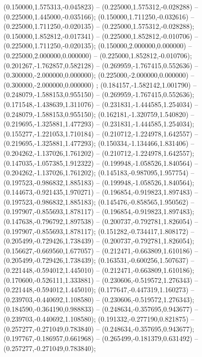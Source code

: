 (0.150000,1.575313,-0.045823) -- (0.225000,1.575312,-0.028288) -- (0.225000,1.445000,-0.035166);
 (0.150000,1.711250,-0.032616) -- (0.225000,1.711250,-0.020135) -- (0.225000,1.575312,-0.028288);
 (0.150000,1.852812,-0.017341) -- (0.225000,1.852812,-0.010706) -- (0.225000,1.711250,-0.020135);
 (0.150000,2.000000,0.000000) -- (0.225000,2.000000,0.000000) -- (0.225000,1.852812,-0.010706);
 (0.201267,-1.762857,0.582128) -- (0.269959,-1.767415,0.552636) -- (0.300000,-2.000000,0.000000);
 (0.225000,-2.000000,0.000000) -- (0.300000,-2.000000,0.000000) ;
 (0.184157,-1.582142,1.001790) -- (0.248079,-1.588153,0.955150) -- (0.269959,-1.767415,0.552636);
 (0.171548,-1.438639,1.311076) -- (0.231831,-1.444585,1.254034) -- (0.248079,-1.588153,0.955150);
 (0.162181,-1.320759,1.540820) -- (0.219695,-1.325881,1.477293) -- (0.231831,-1.444585,1.254034);
 (0.155277,-1.221053,1.710184) -- (0.210712,-1.224978,1.642557) -- (0.219695,-1.325881,1.477293);
 (0.150334,-1.134466,1.831406) -- (0.204262,-1.137026,1.761202) -- (0.210712,-1.224978,1.642557);
 (0.147035,-1.057385,1.912322) -- (0.199948,-1.058526,1.840564) -- (0.204262,-1.137026,1.761202);
 (0.145183,-0.987095,1.957754) -- (0.197523,-0.986832,1.885183) -- (0.199948,-1.058526,1.840564);
 (0.144673,-0.921435,1.970271) -- (0.196854,-0.919823,1.897483) -- (0.197523,-0.986832,1.885183);
 (0.145476,-0.858565,1.950562) -- (0.197907,-0.855693,1.878117) -- (0.196854,-0.919823,1.897483);
 (0.147638,-0.796792,1.897538) -- (0.200737,-0.792781,1.826054) -- (0.197907,-0.855693,1.878117);
 (0.151282,-0.734417,1.808172) -- (0.205499,-0.729426,1.738439) -- (0.200737,-0.792781,1.826054);
 (0.156627,-0.669560,1.677057) -- (0.212471,-0.663809,1.610186) -- (0.205499,-0.729426,1.738439);
 (0.163531,-0.600256,1.507637) -- (0.221448,-0.594012,1.445010) -- (0.212471,-0.663809,1.610186);
 (0.170600,-0.526111,1.333881) -- (0.230606,-0.519572,1.276343) -- (0.221448,-0.594012,1.445010);
 (0.177647,-0.447319,1.160273) -- (0.239703,-0.440692,1.108580) -- (0.230606,-0.519572,1.276343);
 (0.184590,-0.364190,0.988833) -- (0.248634,-0.357695,0.943677) -- (0.239703,-0.440692,1.108580);
 (0.191332,-0.277190,0.821875) -- (0.257277,-0.271049,0.783840) -- (0.248634,-0.357695,0.943677);
 (0.197767,-0.186957,0.661968) -- (0.265499,-0.181379,0.631492) -- (0.257277,-0.271049,0.783840);
